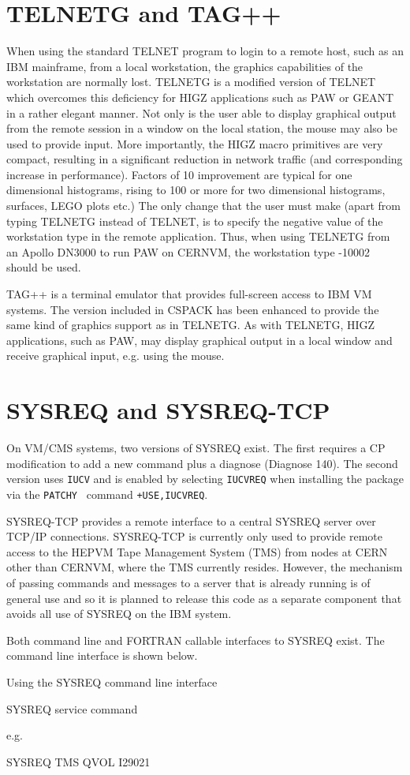 \chapter{TELNETG and TAG++}
\par
When using the standard TELNET program to login to a remote host,
such as an IBM mainframe, from a local workstation,
the graphics capabilities of the workstation are normally lost.
TELNETG is a modified version of TELNET which overcomes this
deficiency for HIGZ applications such as PAW or GEANT in a rather
elegant manner.
Not only is the user able to display graphical output from the
remote session in a window on the local station, the mouse
may also be used to provide input. More importantly,
the HIGZ macro primitives are very compact, resulting in
a significant reduction in network traffic (and corresponding
increase in performance). Factors of 10 improvement are typical
for one dimensional histograms, rising to 100 or more for two dimensional
histograms, surfaces, LEGO plots etc.)
The only change that the user must make (apart from typing TELNETG
instead of TELNET,
is to specify the negative value of the
workstation type in the remote application. Thus, when using
TELNETG from an Apollo DN3000 to run PAW on CERNVM, the workstation
type -10002 should be used.
\par
TAG++ is a terminal emulator that provides full-screen access
to IBM VM systems. The version included in CSPACK has been enhanced
to provide the same kind of graphics support as in TELNETG.
As with TELNETG, HIGZ applications, such as PAW, may display
graphical output in a local window and receive graphical input, e.g.
using the mouse.
\chapter{SYSREQ and SYSREQ-TCP}
\par
On VM/CMS systems, two versions of SYSREQ exist. The first requires
a CP modification to add a new command plus a diagnose (Diagnose 140).
The second version uses {\tt IUCV} and is enabled by selecting
{\tt IUCVREQ} when installing the package via the {\tt PATCHY}~\cite{bib-PATCHY}
command {\tt +USE,IUCVREQ}.
\par
SYSREQ-TCP provides a remote interface to a central SYSREQ server
over TCP/IP connections.
SYSREQ-TCP is currently only used to provide remote access to the HEPVM
Tape Management System (TMS) from nodes at CERN other than CERNVM, where the
TMS currently resides. However, the mechanism of passing commands
and messages to a server that is already running is of general
use and so it is planned to release this code as a separate
component that avoids all use of SYSREQ on the IBM system.
\par
Both command line and FORTRAN callable interfaces to SYSREQ exist.
The command line interface is shown below.
\begin{XMPt}{Using the SYSREQ command line interface}

SYSREQ service command

e.g.

SYSREQ TMS QVOL I29021

\end{XMPt}
